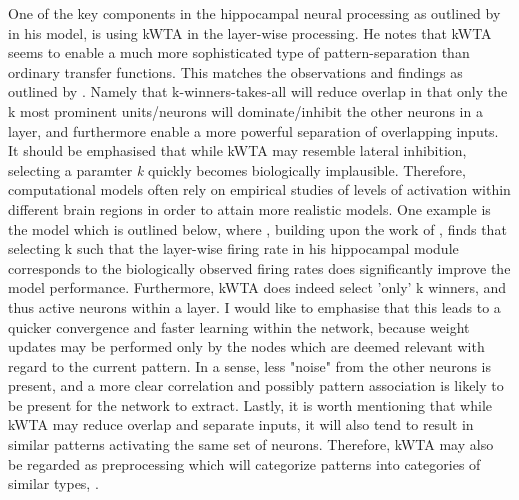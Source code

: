 One of the key components in the hippocampal neural processing as outlined by \cite{Hattori2014} in his model, is using kWTA in the layer-wise processing. He notes that kWTA seems to enable a much more sophisticated type of pattern-separation than ordinary transfer functions. This matches the observations and findings as outlined by \cite{Rolls1998chpt4, Rolls1998chpt6}. Namely that k-winners-takes-all will reduce overlap in that only the k most prominent units/neurons will dominate/inhibit the other neurons in a layer, and furthermore enable a more powerful separation of overlapping inputs. It should be emphasised that while kWTA may resemble lateral inhibition, selecting a paramter \textit{k} quickly becomes biologically implausible. Therefore, computational models often rely on empirical studies of levels of activation within different brain regions in order to attain more realistic models. One example is the model which is outlined below, where \cite{Hattori2014}, building upon the work of \cite{Wakagi2008}, finds that selecting k such that the layer-wise firing rate in his hippocampal module corresponds to the biologically observed firing rates does significantly improve the model performance. Furthermore, kWTA does indeed select 'only' k winners, and thus active neurons within a layer. I would like to emphasise that this leads to a quicker convergence and faster learning within the network, because weight updates may be performed only by the nodes which are deemed relevant with regard to the current pattern. In a sense, less "noise" from the other neurons is present, and a more clear correlation and possibly pattern association is likely to be present for the network to extract.
Lastly, it is worth mentioning that while kWTA may reduce overlap and separate inputs, it will also tend to result in similar patterns activating the same set of neurons. Therefore, kWTA may also be regarded as preprocessing which will categorize patterns into categories of similar types, \citep{Rolls1998chpt1}.


